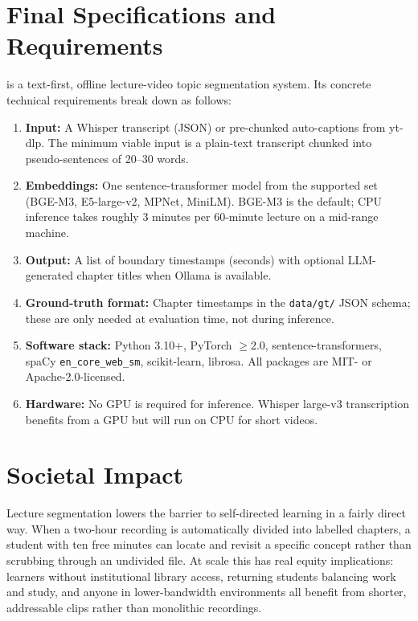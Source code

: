 
\section{Final Specifications and Requirements}

\lecseg{} is a text-first, offline lecture-video topic segmentation system.
Its concrete technical requirements break down as follows:

\begin{enumerate}
  \item \textbf{Input:} A Whisper transcript (JSON) or pre-chunked auto-captions
        from yt-dlp. The minimum viable input is a plain-text transcript chunked into
        pseudo-sentences of 20--30 words.
  \item \textbf{Embeddings:} One sentence-transformer model from the supported set
        (BGE-M3, E5-large-v2, MPNet, MiniLM). BGE-M3 is the default; CPU inference
        takes roughly 3 minutes per 60-minute lecture on a mid-range machine.
  \item \textbf{Output:} A list of boundary timestamps (seconds) with optional
        LLM-generated chapter titles when Ollama is available.
  \item \textbf{Ground-truth format:} Chapter timestamps in the \texttt{data/gt/}
        JSON schema; these are only needed at evaluation time, not during inference.
  \item \textbf{Software stack:} Python 3.10+, PyTorch $\geq$2.0, sentence-transformers,
        spaCy \texttt{en\_core\_web\_sm}, scikit-learn, librosa. All packages are
        MIT- or Apache-2.0-licensed.
  \item \textbf{Hardware:} No GPU is required for inference. Whisper large-v3
        transcription benefits from a GPU but will run on CPU for short videos.
\end{enumerate}

\section{Societal Impact}

Lecture segmentation lowers the barrier to self-directed learning in a fairly
direct way. When a two-hour recording is automatically divided into labelled chapters,
a student with ten free minutes can locate and revisit a specific concept rather
than scrubbing through an undivided file.
At scale this has real equity implications: learners without institutional
library access, returning students balancing work and study, and anyone in
lower-bandwidth environments all benefit from shorter, addressable clips rather
than monolithic recordings.

